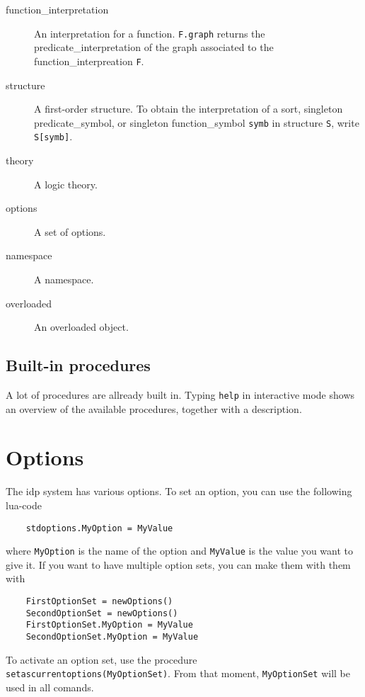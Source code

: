 \documentclass[a4]{article}
\newcommand{\idp}{{\sc idp}\xspace}
\newcommand{\code}[1]{{\tt #1}}
\begin{document}
\begin{description}
	\item[function\_interpretation] An interpretation for a function. {\tt F.graph} returns the predicate\_interpretation of the graph associated to the function\_interpreation {\tt F}. %
	\item[structure] A first-order structure. To obtain the interpretation of a sort, singleton predicate\_symbol, or singleton function\_symbol {\tt symb} in structure {\tt S}, write {\tt S[symb]}.
	\item[theory] A logic theory.
	\item[options] A set of options.
	\item[namespace] A namespace.
	\item[overloaded] An overloaded object.
\end{description}


\subsection{Built-in procedures}

A lot of procedures are allready built in.  Typing \code{help} in interactive mode shows an overview of the available procedures, together with a description.  





\section{Options}
The \idp system has various options.  To set an option, you can use the following lua-code
\begin{lstlisting}
	stdoptions.MyOption = MyValue
\end{lstlisting}
where \code{MyOption} is the name of the option and \code{MyValue} is the value you want to give it. If you want to have multiple option sets, you can make them with them with
\begin{lstlisting}
	FirstOptionSet = newOptions()
	SecondOptionSet = newOptions()
	FirstOptionSet.MyOption = MyValue
	SecondOptionSet.MyOption = MyValue
\end{lstlisting}
To activate an option set, use the procedure \code{setascurrentoptions(MyOptionSet)}.  From that moment, \code{MyOptionSet} will be used in all comands.
\end{document}
